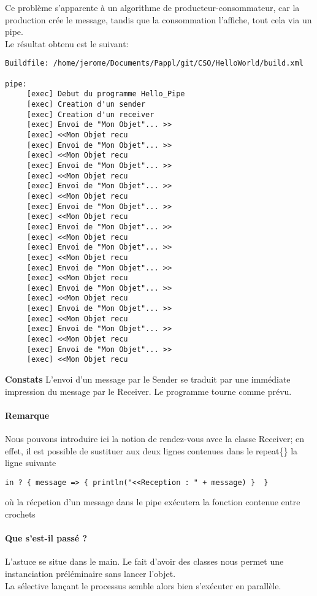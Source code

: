 \documentclass[a4paper,11pt,french]{report}
\begin{document}
Ce problème s'apparente à un algorithme de producteur-consommateur, car la production crée le message, tandis que la consommation l'affiche, tout cela via un pipe.\\
Le résultat obtenu est le suivant:


\begin{lstlisting}[frame=trBL]
Buildfile: /home/jerome/Documents/Pappl/git/CSO/HelloWorld/build.xml

pipe:
     [exec] Debut du programme Hello_Pipe
     [exec] Creation d'un sender
     [exec] Creation d'un receiver
     [exec] Envoi de "Mon Objet"... >>
     [exec] <<Mon Objet recu
     [exec] Envoi de "Mon Objet"... >>
     [exec] <<Mon Objet recu
     [exec] Envoi de "Mon Objet"... >>
     [exec] <<Mon Objet recu
     [exec] Envoi de "Mon Objet"... >>
     [exec] <<Mon Objet recu
     [exec] Envoi de "Mon Objet"... >>
     [exec] <<Mon Objet recu
     [exec] Envoi de "Mon Objet"... >>
     [exec] <<Mon Objet recu
     [exec] Envoi de "Mon Objet"... >>
     [exec] <<Mon Objet recu
     [exec] Envoi de "Mon Objet"... >>
     [exec] <<Mon Objet recu
     [exec] Envoi de "Mon Objet"... >>
     [exec] <<Mon Objet recu
     [exec] Envoi de "Mon Objet"... >>
     [exec] <<Mon Objet recu
     [exec] Envoi de "Mon Objet"... >>
     [exec] <<Mon Objet recu
     [exec] Envoi de "Mon Objet"... >>
     [exec] <<Mon Objet recu
\end{lstlisting}

\bigskip

\textbf{Constats} L'envoi d'un message par le \textsf{Sender} se traduit par une immédiate impression du message par le \textsf{Receiver}. Le programme tourne comme prévu.

\paragraph{Remarque} Nous pouvons introduire ici la notion de rendez-vous avec la classe Receiver; en effet, il est possible de sustituer aux deux lignes contenues dans le \textsf{repeat\{\}} la ligne suivante
\begin{center}
\begin{verbatim}
in ? { message => { println("<<Reception : " + message) }  }
\end{verbatim}
\end{center}
où la récpetion d'un message dans le pipe exécutera la fonction contenue entre crochets


\paragraph{Que s'est-il passé ?} L'astuce se situe dans le \textsf{main}. Le fait d'avoir des classes nous permet une instanciation préléminaire sans lancer l'objet.\\
La sélective lançant le processus semble alors bien s'exécuter en parallèle.\\
\end{document}
